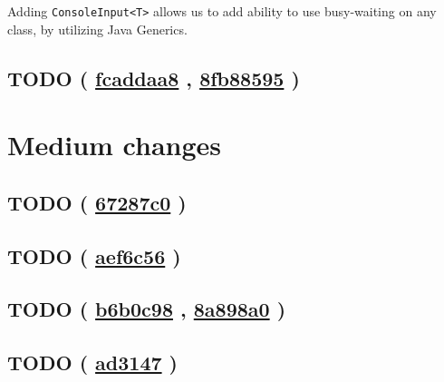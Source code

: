 \documentclass{article}
\newcommand{\code}[1]{\texttt{#1}}
\newcommand{\gh}[1]{%
  \href{https://github.com/awave1/assessment-loan-system/commit/#1}{#1}%
}
\begin{document}
Adding \code{ConsoleInput<T>} allows us to add ability to use busy-waiting on any class, by utilizing Java Generics.

\subsection*{TODO (\gh{fcaddaa8}, \gh{8fb88595})}

\section*{Medium changes}

\subsection*{TODO (\gh{67287c0})}

\subsection*{TODO (\gh{aef6c56})}

\subsection*{TODO (\gh{b6b0c98}, \gh{8a898a0})}

\subsection*{TODO (\gh{ad3147})}

\end{document}
